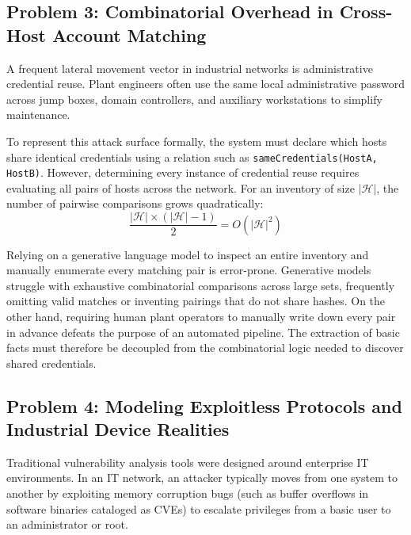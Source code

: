 \documentclass[target=mst,aauheader=aics,style=]{thud}
\begin{document}
\subsection{Problem 3: Combinatorial Overhead in Cross-Host Account Matching}
A frequent lateral movement vector in industrial networks is administrative credential reuse. Plant engineers often use the same local administrative password across jump boxes, domain controllers, and auxiliary workstations to simplify maintenance.

To represent this attack surface formally, the system must declare which hosts share identical credentials using a relation such as \texttt{sameCredentials(HostA, HostB)}. However, determining every instance of credential reuse requires evaluating all pairs of hosts across the network. For an inventory of size $|\mathcal{H}|$, the number of pairwise comparisons grows quadratically:
\begin{equation}
\frac{|\mathcal{H}| \times (|\mathcal{H}| - 1)}{2} = O(|\mathcal{H}|^2)
\end{equation}

Relying on a generative language model to inspect an entire inventory and manually enumerate every matching pair is error-prone. Generative models struggle with exhaustive combinatorial comparisons across large sets, frequently omitting valid matches or inventing pairings that do not share hashes. On the other hand, requiring human plant operators to manually write down every pair in advance defeats the purpose of an automated pipeline. The extraction of basic facts must therefore be decoupled from the combinatorial logic needed to discover shared credentials.

\subsection{Problem 4: Modeling Exploitless Protocols and Industrial Device Realities}
Traditional vulnerability analysis tools were designed around enterprise IT environments. In an IT network, an attacker typically moves from one system to another by exploiting memory corruption bugs (such as buffer overflows in software binaries cataloged as CVEs) to escalate privileges from a basic user to an administrator or root.
\end{document}
